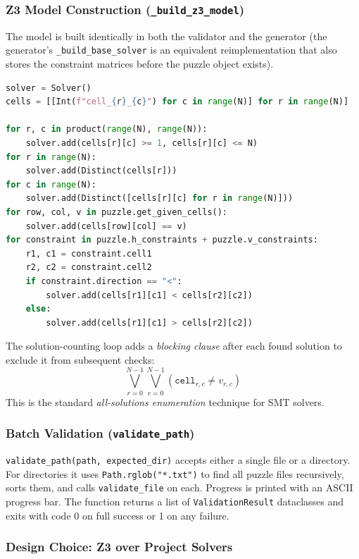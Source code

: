 \subsubsection{Z3 Model Construction (\texttt{\_build\_z3\_model})}

The model is built identically in both the validator and the generator (the
generator's \texttt{\_build\_base\_solver} is an equivalent reimplementation
that also stores the constraint matrices before the puzzle object exists).

\begin{lstlisting}[language=Python, caption={Z3 model core (simplified).}]
solver = Solver()
cells = [[Int(f"cell_{r}_{c}") for c in range(N)] for r in range(N)]

for r, c in product(range(N), range(N)):
    solver.add(cells[r][c] >= 1, cells[r][c] <= N)
for r in range(N):
    solver.add(Distinct(cells[r]))
for c in range(N):
    solver.add(Distinct([cells[r][c] for r in range(N)]))
for row, col, v in puzzle.get_given_cells():
    solver.add(cells[row][col] == v)
for constraint in puzzle.h_constraints + puzzle.v_constraints:
    r1, c1 = constraint.cell1
    r2, c2 = constraint.cell2
    if constraint.direction == "<":
        solver.add(cells[r1][c1] < cells[r2][c2])
    else:
        solver.add(cells[r1][c1] > cells[r2][c2])
\end{lstlisting}

The solution-counting loop adds a \emph{blocking clause} after each found
solution to exclude it from subsequent checks:
\[
  \bigvee_{r=0}^{N-1} \bigvee_{c=0}^{N-1}
  \left( \texttt{cell}_{r,c} \ne v_{r,c} \right)
\]
This is the standard \emph{all-solutions enumeration} technique for SMT
solvers.

\subsubsection{Batch Validation (\texttt{validate\_path})}

\texttt{validate\_path(path, expected\_dir)} accepts either a single file or
a directory.
For directories it uses \texttt{Path.rglob("*.txt")} to find all puzzle files
recursively, sorts them, and calls \texttt{validate\_file} on each.
Progress is printed with an ASCII progress bar.
The function returns a list of \texttt{ValidationResult} dataclasses and
exits with code 0 on full success or 1 on any failure.

\subsubsection{Design Choice: Z3 over Project Solvers}

